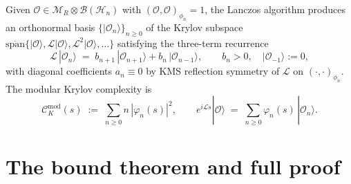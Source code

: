 \documentclass[12pt,a4paper]{article}
\begin{document}
Given $\mathcal{O} \in \mathcal{M}_R \otimes \mathcal{B}(\mathcal{H}_n)$
with $(\mathcal{O},\mathcal{O})_{\phi_n} = 1$, the Lanczos algorithm
produces an orthonormal basis $\{|\mathcal{O}_n\rangle\}_{n\ge 0}$ of
the Krylov subspace $\overline{\mathrm{span}}\{|\mathcal{O}\rangle,
\mathcal{L}|\mathcal{O}\rangle, \mathcal{L}^2|\mathcal{O}\rangle, \ldots\}$
satisfying the three-term recurrence
\begin{equation}
  \mathcal{L}\,|\mathcal{O}_n\rangle
  \;=\; b_{n+1}\,|\mathcal{O}_{n+1}\rangle + b_n\,|\mathcal{O}_{n-1}\rangle,
  \qquad
  b_n > 0,\quad |\mathcal{O}_{-1}\rangle := 0,
  \label{eq:lanczos}
\end{equation}
with diagonal coefficients $a_n \equiv 0$ by KMS reflection symmetry
of $\mathcal{L}$ on $(\cdot,\cdot)_{\phi_n}$. The modular Krylov
complexity is
\begin{equation}
  \mathcal{C}_K^{\mathrm{mod}}(s)
  \;:=\;
  \sum_{n \ge 0} n\,|\varphi_n(s)|^2,
  \qquad
  e^{i\mathcal{L}s}|\mathcal{O}\rangle
  \;=\;
  \sum_{n \ge 0} \varphi_n(s)\,|\mathcal{O}_n\rangle.
  \label{eq:CKmod}
\end{equation}

\section{The bound theorem and full proof}
\label{sec:proof}
\end{document}

